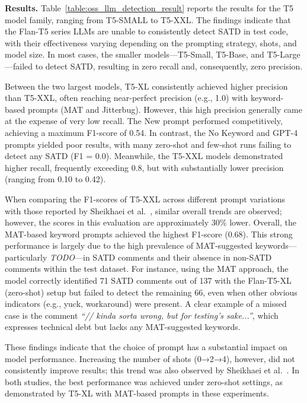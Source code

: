 

\textbf{Results.} Table~\ref{table:oss_llm_detection_result} reports the results for the T5 model family, ranging from T5-SMALL to T5-XXL. The findings indicate that the Flan-T5 series LLMs are unable to consistently detect SATD in test code, with their effectiveness varying depending on the prompting strategy, shots, and model size. In most cases, the smaller models---T5-Small, T5-Base, and T5-Large---failed to detect SATD, resulting in zero recall and, consequently, zero precision.

Between the two largest models, T5-XL consistently achieved higher precision than T5-XXL, often reaching near-perfect precision (e.g., 1.0) with keyword-based prompts (MAT and Jitterbug). However, this high precision generally came at the expense of very low recall. The New prompt performed competitively, achieving a maximum F1-score of 0.54. In contrast, the No Keyword and GPT-4 prompts yielded poor results, with many zero-shot and few-shot runs failing to detect any SATD (F1 = 0.0). Meanwhile, the T5-XXL models demonstrated higher recall, frequently exceeding 0.8, but with substantially lower precision (ranging from 0.10 to 0.42).

When comparing the F1-scores of T5-XXL across different prompt variations with those reported by Sheikhaei et al.~\cite{sheikhaei_empirical_2024}, similar overall trends are observed; however, the scores in this evaluation are approximately 30\% lower. Overall, the MAT-based keyword prompts achieved the highest F1-score (0.68). This strong performance is largely due to the high prevalence of MAT-suggested keywords—particularly \textit{TODO}—in SATD comments and their absence in non-SATD comments within the test dataset. For instance, using the MAT approach, the model correctly identified 71 SATD comments out of 137 with the Flan-T5-XL (zero-shot) setup but failed to detect the remaining 66, even when other obvious indicators (e.g., yuck, workaround) were present. A clear example of a missed case is the comment \textit{“// kinda sorta wrong, but for testing’s sake...”}, which expresses technical debt but lacks any MAT-suggested keywords.

These findings indicate that the choice of prompt has a substantial impact on model performance. Increasing the number of shots (0→2→4), however, did not consistently improve results; this trend was also observed by Sheikhaei et al.~\cite{sheikhaei_empirical_2024}. In both studies, the best performance was achieved under zero-shot settings, as demonstrated by T5-XL with MAT-based prompts in these experiments.



